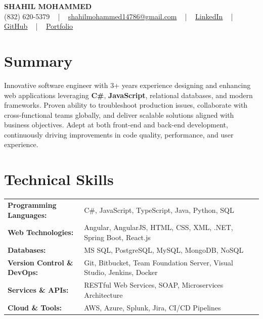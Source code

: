 \documentclass[letterpaper,11pt]{article}
\begin{document}
\begin{center}
    {\fontsize{14pt}{12pt}\selectfont \textbf{\MakeUppercase{Shahil Mohammed}}}\\ \vspace{2pt}
    \fontsize{10pt}{12pt}\selectfont (832) 620-5379 ~ | ~ \href{mailto:shahilmohammed14786@gmail.com}{shahilmohammed14786@gmail.com} ~ | ~  
    \href{https://www.linkedin.com/in/shahil-mohammed-9652931a1/}{\color{blue}\underline{LinkedIn}}  ~ | ~ 
    \href{https://github.com/freakbeast14}{\color{blue}\underline{GitHub}} ~ | ~ 
    \href{https://shahil-mohammed.netlify.app/}{\color{blue}\underline{Portfolio}}
    \vspace{-8pt}
\end{center}

\section{Summary}
\fontsize{9pt}{10pt}\selectfont
Innovative software engineer with 3+ years experience designing and enhancing web applications leveraging \textbf{C\#}, \textbf{JavaScript}, relational databases, and modern frameworks. Proven ability to troubleshoot production issues, collaborate with cross-functional teams globally, and deliver scalable solutions aligned with business objectives. Adept at both front-end and back-end development, continuously driving improvements in code quality, performance, and user experience.
 \vspace{-5pt}
 
\section{Technical Skills}
        \vspace{-14pt}
        \begin{table}[h]
            \fontsize{9pt}{10pt}\selectfont
            \begin{tabular}{p{0.3\linewidth} p{0.7\linewidth}}
                \textbf{Programming Languages:} & C\#, JavaScript, TypeScript, Java, Python, SQL \\
                \textbf{Web Technologies:} & Angular, AngularJS, HTML, CSS, XML, .NET, Spring Boot, React.js \\
                \textbf{Databases:} & MS SQL, PostgreSQL, MySQL, MongoDB, NoSQL \\
                \textbf{Version Control \& DevOps:} & Git, Bitbucket, Team Foundation Server, Visual Studio, Jenkins, Docker \\
                \textbf{Services \& APIs:} & RESTful Web Services, SOAP, Microservices Architecture \\
                \textbf{Cloud \& Tools:} & AWS, Azure, Splunk, Jira, CI/CD Pipelines \\
            \end{tabular}
        \end{table}
 \vspace{-15pt}
 
\end{document}
